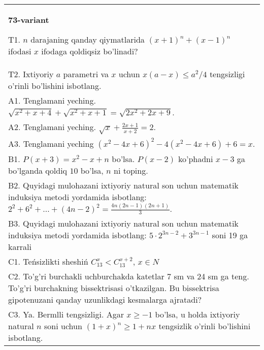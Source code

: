 \documentclass{article}
\begin{document}
\begin{tabular}{m{17cm}}
\textbf{73-variant}
\newline

T1. \(n\) darajaning qanday qiymatlarida \((x + 1)^{n} + (x - 1)^{n}\) ifodasi \(x\) ifodaga qoldiqsiz bo'linadi? \\
T2. Ixtiyoriy \(a\) parametri va \(x\) uchun \(x(a - x) \leq a^{2}/4\) tengsizligi o'rinli bo'lishini isbotlang. \\
A1. Tenglamani yeching. \(\sqrt{x^{2} + x + 4} + \sqrt{x^{2} + x + 1} = \sqrt{2x^{2} + 2x + 9}\). \\
A2. Tenglamani yeching. \(\sqrt{x} + \frac{2x + 1}{x + 2} = 2\). \\
A3. Tenglamani yeching \(\left( x^{2} - 4x + 6 \right)^{2} - 4\left( x^{2} - 4x + 6 \right) + 6 = x\). \\
B1. \(P(x + 3) = x^{2} - x + n\) bo'lsa. \(P(x - 2)\) ko'phadni \(x - 3\) ga bo'lganda qoldiq \(10\) bo'lsa, \(n\) ni toping. \\
B2. Quyidagi mulohazani ixtiyoriy natural son uchun matematik induksiya metodi yordamida isbotlang: \(2^{2} + 6^{2} + \ldots + (4n - 2)^{2} = \frac{4n(2n - 1)(2n + 1)}{3}\). \\
B3. Quyidagi mulohazani ixtiyoriy natural son uchun matematik induksiya metodi yordamida isbotlang: \(5 \cdot 2^{3n - 2} + 3^{3n - 1}\) soni 19 ga karrali \\
C1. Teńsizlikti sheshiń \(C_{13}^{x} < C_{13}^{x + 2}\), \(x \in N\) \\
C2. To'g'ri burchakli uchburchakda katetlar 7 sm va 24 sm ga teng. To'g'ri burchakning bissektrisasi o'tkazilgan. Bu bissektrisa gipotenuzani qanday uzunlikdagi kesmalarga ajratadi? \\
C3. Ya. Bermlli tengsizligi. Agar \(x \geq - 1\) bo'lsa, u holda ixtiyoriy natural \(n\) soni uchun \((1 + x)^{n} \geq 1 + nx\) tengsizlik o'rinli bo'lishini isbotlang. \\

\end{tabular}
\vspace{1cm}
\end{document}
